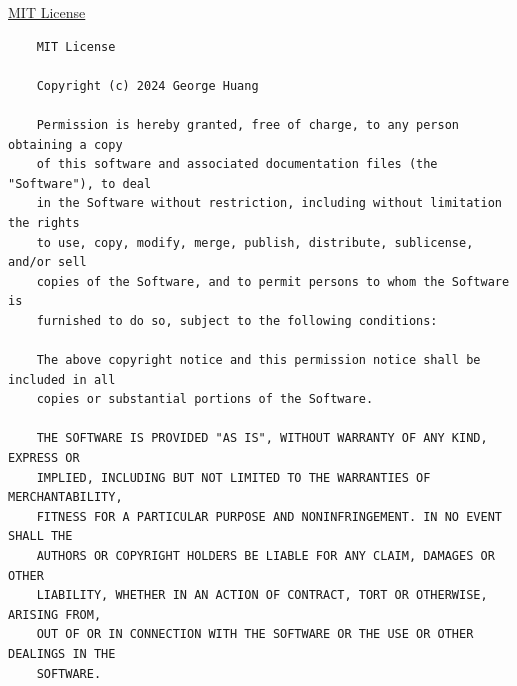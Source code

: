 \documentclass{article}
\begin{document}
\href{https://github.com/Goge052215/MATLAB-Calculator-on-py/blob/master/LICENSE}{MIT License}

\begin{verbatim}
    MIT License

    Copyright (c) 2024 George Huang

    Permission is hereby granted, free of charge, to any person obtaining a copy
    of this software and associated documentation files (the "Software"), to deal
    in the Software without restriction, including without limitation the rights
    to use, copy, modify, merge, publish, distribute, sublicense, and/or sell
    copies of the Software, and to permit persons to whom the Software is
    furnished to do so, subject to the following conditions:

    The above copyright notice and this permission notice shall be included in all
    copies or substantial portions of the Software.

    THE SOFTWARE IS PROVIDED "AS IS", WITHOUT WARRANTY OF ANY KIND, EXPRESS OR
    IMPLIED, INCLUDING BUT NOT LIMITED TO THE WARRANTIES OF MERCHANTABILITY,
    FITNESS FOR A PARTICULAR PURPOSE AND NONINFRINGEMENT. IN NO EVENT SHALL THE
    AUTHORS OR COPYRIGHT HOLDERS BE LIABLE FOR ANY CLAIM, DAMAGES OR OTHER
    LIABILITY, WHETHER IN AN ACTION OF CONTRACT, TORT OR OTHERWISE, ARISING FROM,
    OUT OF OR IN CONNECTION WITH THE SOFTWARE OR THE USE OR OTHER DEALINGS IN THE
    SOFTWARE.
\end{verbatim}
\end{document}
